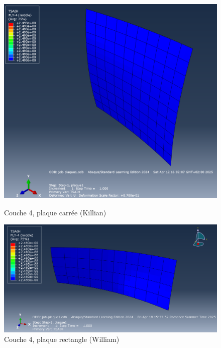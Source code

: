 \documentclass[a4paper,12pt]{article}
\begin{document}
\begin{figure}[h!]
	\centering
	\begin{minipage}{0.495\textwidth}
		\centering
		\includegraphics[width=\textwidth]{media/K_P1_L4_12042025.png} %
		\caption{Couche 4, plaque carrée (Killian)}
		\label{fig:image1}
	\end{minipage}
	\hfill
	\begin{minipage}{0.495\textwidth}
		\centering
		\includegraphics[width=\textwidth]{media/Couche4_.png} %
		\caption{Couche 4, plaque rectangle (William)}
		\label{fig:image2}
	\end{minipage}
\end{figure}
\end{document}

